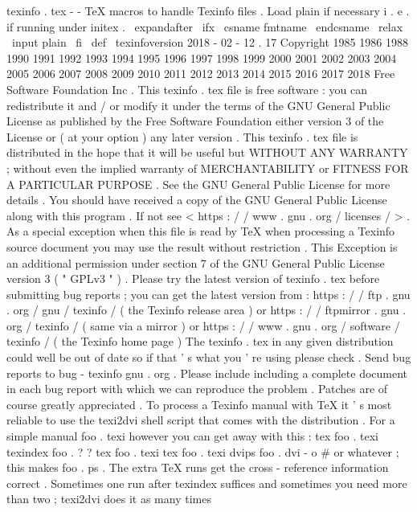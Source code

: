 %
texinfo
.
tex
-
-
TeX
macros
to
handle
Texinfo
files
.
%
%
Load
plain
if
necessary
i
.
e
.
if
running
under
initex
.
\
expandafter
\
ifx
\
csname
fmtname
\
endcsname
\
relax
\
input
plain
\
fi
%
\
def
\
texinfoversion
{
2018
-
02
-
12
.
17
}
%
%
Copyright
1985
1986
1988
1990
1991
1992
1993
1994
1995
%
1996
1997
1998
1999
2000
2001
2002
2003
2004
2005
2006
%
2007
2008
2009
2010
2011
2012
2013
2014
2015
2016
2017
2018
%
Free
Software
Foundation
Inc
.
%
%
This
texinfo
.
tex
file
is
free
software
:
you
can
redistribute
it
and
/
or
%
modify
it
under
the
terms
of
the
GNU
General
Public
License
as
%
published
by
the
Free
Software
Foundation
either
version
3
of
the
%
License
or
(
at
your
option
)
any
later
version
.
%
%
This
texinfo
.
tex
file
is
distributed
in
the
hope
that
it
will
be
%
useful
but
WITHOUT
ANY
WARRANTY
;
without
even
the
implied
warranty
%
of
MERCHANTABILITY
or
FITNESS
FOR
A
PARTICULAR
PURPOSE
.
See
the
GNU
%
General
Public
License
for
more
details
.
%
%
You
should
have
received
a
copy
of
the
GNU
General
Public
License
%
along
with
this
program
.
If
not
see
<
https
:
/
/
www
.
gnu
.
org
/
licenses
/
>
.
%
%
As
a
special
exception
when
this
file
is
read
by
TeX
when
processing
%
a
Texinfo
source
document
you
may
use
the
result
without
%
restriction
.
This
Exception
is
an
additional
permission
under
section
7
%
of
the
GNU
General
Public
License
version
3
(
"
GPLv3
"
)
.
%
%
Please
try
the
latest
version
of
texinfo
.
tex
before
submitting
bug
%
reports
;
you
can
get
the
latest
version
from
:
%
https
:
/
/
ftp
.
gnu
.
org
/
gnu
/
texinfo
/
(
the
Texinfo
release
area
)
or
%
https
:
/
/
ftpmirror
.
gnu
.
org
/
texinfo
/
(
same
via
a
mirror
)
or
%
https
:
/
/
www
.
gnu
.
org
/
software
/
texinfo
/
(
the
Texinfo
home
page
)
%
The
texinfo
.
tex
in
any
given
distribution
could
well
be
out
%
of
date
so
if
that
'
s
what
you
'
re
using
please
check
.
%
%
Send
bug
reports
to
bug
-
texinfo
gnu
.
org
.
Please
include
including
a
%
complete
document
in
each
bug
report
with
which
we
can
reproduce
the
%
problem
.
Patches
are
of
course
greatly
appreciated
.
%
%
To
process
a
Texinfo
manual
with
TeX
it
'
s
most
reliable
to
use
the
%
texi2dvi
shell
script
that
comes
with
the
distribution
.
For
a
simple
%
manual
foo
.
texi
however
you
can
get
away
with
this
:
%
tex
foo
.
texi
%
texindex
foo
.
?
?
%
tex
foo
.
texi
%
tex
foo
.
texi
%
dvips
foo
.
dvi
-
o
#
or
whatever
;
this
makes
foo
.
ps
.
%
The
extra
TeX
runs
get
the
cross
-
reference
information
correct
.
%
Sometimes
one
run
after
texindex
suffices
and
sometimes
you
need
more
%
than
two
;
texi2dvi
does
it
as
many
times
